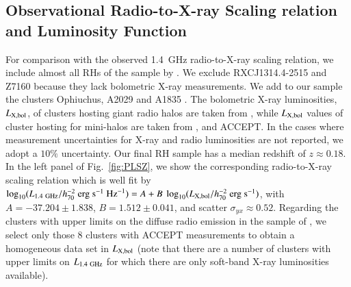 \documentclass[useAMS,usenatbib]{mn2e}
\begin{document}
\begin{appendix}

\section{Observational Radio-to-X-ray Scaling relation and Luminosity Function}
\label{app:D}

For comparison with the observed 1.4~GHz radio-to-X-ray scaling relation, we
include almost all RHs of the sample by \cite{2011A&A...527A..99E}. 
We exclude RXCJ1314.4-2515 and Z7160 because they lack bolometric X-ray measurements. 
We add to our sample the clusters Ophiuchus, A2029 and A1835
\citep{2009A&A...499..371G}. The bolometric X-ray luminosities,
$L_{{\mathrm{X,bol}}}$, of clusters hosting giant radio halos are taken from
\cite{2009A&A...507..661B}, while $L_{{\mathrm{X,bol}}}$ values of cluster hosting
for mini-halos are taken from \cite{2002ApJ...567..716R},
\cite{Boehringer:1998vv} and ACCEPT. In the cases where measurement
uncertainties for X-ray and radio luminosities are not reported, we adopt a
$10\%$ uncertainty. Our final RH sample has a median redshift of
$z\approx0.18$. In the left panel of Fig.~\ref{fig:PLSZ}, we show the
corresponding radio-to-X-ray scaling relation which is well fit by $\log_{10}
(L_{1.4~{\mathrm{GHz}}}/h_{70}^{-2}~{\mathrm{erg}}~{\mathrm{s}}^{-1}~{\mathrm{Hz}}^{-1}) = A +
B~\log_{10} (L_{{\mathrm{X,bol}}}/h_{70}^{-2}~{\mathrm{erg}}~{\mathrm{s}}^{-1})$, with
$A=-37.204\pm1.838$, $B=1.512\pm0.041$, and scatter $\sigma_{yx} \approx
0.52$. Regarding the clusters with upper limits on the diffuse radio emission in
the sample of \cite{2011A&A...527A..99E}, we select only those 8 clusters with
ACCEPT measurements to obtain a homogeneous data set in $L_{{\mathrm{X,bol}}}$ (note
that there are a number of clusters with upper limits on $L_{1.4~{\mathrm{GHz}}}$ for
which there are only soft-band X-ray luminosities available).


\end{appendix}
\end{document}
